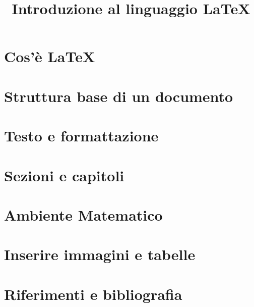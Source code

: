 \documentclass[a4paper, 11pt]{book}
\title{\Huge{Introduzione al linguaggio \LaTeX}}
\begin{document}
\maketitle
\tableofcontents

\chapter{Cos'è \LaTeX}

\chapter{Struttura base di un documento}

\chapter{Testo e formattazione}

\chapter{Sezioni e capitoli}

\chapter{Ambiente Matematico}

\chapter{Inserire immagini e tabelle}

\chapter{Riferimenti e bibliografia}
\end{document}
